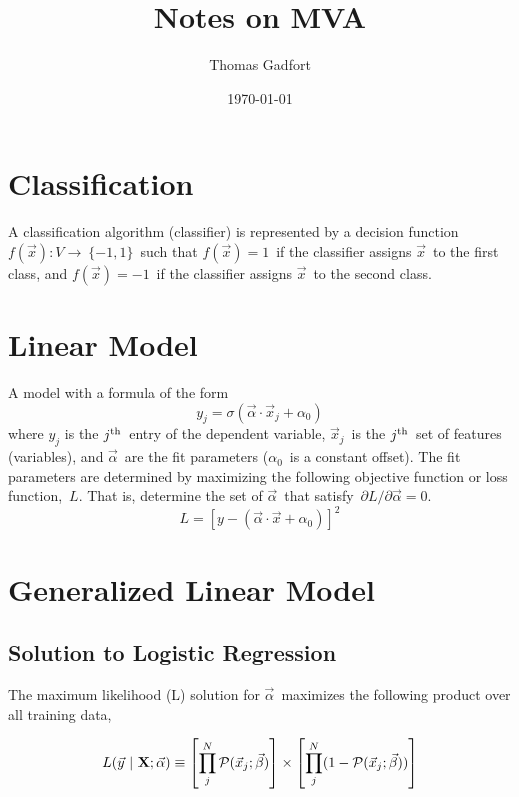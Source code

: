 \documentclass[11pt, oneside]{article}   	%
\title{Notes on MVA}
\author{Thomas Gadfort}
\date{\today}							%
\newcommand{\vx}{\vec{x}}
\newcommand{\vxj}{\vec{x}_{j}}
\newcommand{\bx}{{\bf{X}}}
\newcommand{\vy}{\vec{y}}
\newcommand{\yj}{y_{j}}
\newcommand{\va}{\vec{\alpha}}
\newcommand{\pxj}{\mathcal{P}(\vec{x}_{j};\vec{\beta})}
\begin{document}
\maketitle


\section{Classification}

A classification algorithm (classifier) is represented by a decision function $f(\vx) : V \rightarrow~\{-1,1\}$~such that $f(\vx) = 1$~if the classifier assigns $\vx$~to the first class, and $f(\vx) = -1$~if the classifier assigns $\vx$~to the second class.

\section{Linear Model}
A model with a formula of the form
\begin{equation}
\yj = \sigma(\va\cdot\vxj + \alpha_{0})
\end{equation}
where $\yj$ is the $j^{\rm{th}}$~entry of the dependent variable, $\vxj$~is the $j^{\rm{th}}$~set of features (variables), and $\va$~are the fit parameters ($\alpha_{0}$~is a constant offset). The fit parameters are determined by maximizing the following objective function or loss function,~$L$. That is, determine the set of $\va$~that satisfy~$\partial L / \partial \va = 0$.
\begin{equation}
L = [y - (\vec{\alpha}\cdot\vec{x} + \alpha_{0})]^{2}
\end{equation}




\section{Generalized Linear Model}


\subsection{Solution to Logistic Regression}

The maximum likelihood (L) solution for $\va$~maximizes the following product over all training data,

\begin{equation}
L(\vy~|~\bx ; \va)  \equiv \left[ \prod_{j}^{N} \pxj \right] \times \left[ \prod_{j}^{N} (1-\pxj) \right]
\end{equation}
\end{document}
